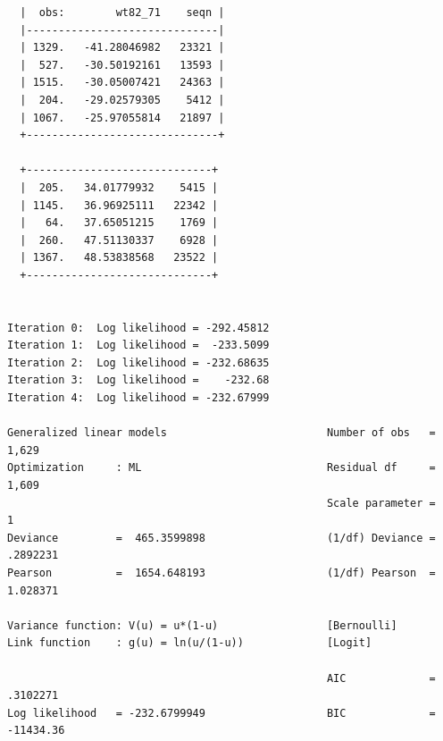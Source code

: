 \documentclass[
  10pt,
  a4paper,
]{book}
\begin{document}
\begin{verbatim}
  |  obs:        wt82_71    seqn |
  |------------------------------|
  | 1329.   -41.28046982   23321 |
  |  527.   -30.50192161   13593 |
  | 1515.   -30.05007421   24363 |
  |  204.   -29.02579305    5412 |
  | 1067.   -25.97055814   21897 |
  +------------------------------+

  +-----------------------------+
  |  205.   34.01779932    5415 |
  | 1145.   36.96925111   22342 |
  |   64.   37.65051215    1769 |
  |  260.   47.51130337    6928 |
  | 1367.   48.53838568   23522 |
  +-----------------------------+


Iteration 0:  Log likelihood = -292.45812  
Iteration 1:  Log likelihood =  -233.5099  
Iteration 2:  Log likelihood = -232.68635  
Iteration 3:  Log likelihood =    -232.68  
Iteration 4:  Log likelihood = -232.67999  

Generalized linear models                         Number of obs   =      1,629
Optimization     : ML                             Residual df     =      1,609
                                                  Scale parameter =          1
Deviance         =  465.3599898                   (1/df) Deviance =   .2892231
Pearson          =  1654.648193                   (1/df) Pearson  =   1.028371

Variance function: V(u) = u*(1-u)                 [Bernoulli]
Link function    : g(u) = ln(u/(1-u))             [Logit]

                                                  AIC             =   .3102271
Log likelihood   = -232.6799949                   BIC             =  -11434.36


\end{verbatim}
\end{document}
